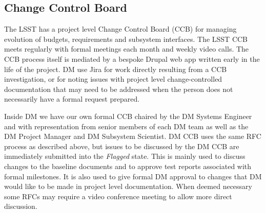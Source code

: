 \subsection{Change Control Board}
\label{sec:ccb}

The LSST has a project level Change Control Board (CCB) for managing evolution of budgets, requirements and subsystem interfaces.
The LSST CCB meets regularly with formal meetings each month and weekly video calls.
The CCB process itself is mediated by a bespoke Drupal web app written early in the life of the project.
DM  use Jira for work directly resulting from a CCB investigation, or for noting issues with project level change-controlled documentation that may need to be addressed when the person does not necessarily have a formal request prepared.

Inside DM we have our own formal CCB
chaired by the DM Systems Engineer and with  representation from senior members of each DM team as well as the DM Project Manager and DM Subsystem Scientist.
DM CCB uses the same RFC process as described above, but issues to be discussed by the DM CCB are immediately submitted into the \emph{Flagged} state.
This is mainly used to discuss changes to the baseline documents and to approve test reports associated with formal milestones.
It is also used to give formal DM approval to changes that DM would like to be made in project level documentation.
When deemed necessary some RFCs may require a video conference meeting to allow more direct discussion.
